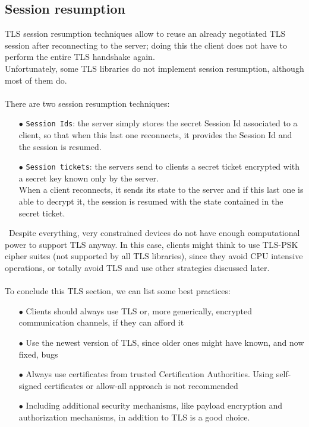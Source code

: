 \documentclass[12pt]{report}
\begin{document}
{{\subsection{Session resumption}
\bigskip
TLS session resumption techniques allow to reuse an already negotiated TLS session after reconnecting to the server; doing this the client does not have to perform the entire TLS handshake again.\\
Unfortunately, some TLS libraries do not implement session resumption, although most of them do.\\\\
There are two session resumption techniques:
\begin{itemize}
\setlength{\itemindent}{+4mm}
  \item[$\bullet$] \texttt{Session Ids}: the server simply stores the secret Session Id associated to a client, so that when this last one reconnects, it provides the Session Id and the session is resumed.
  \item[$\bullet$] \texttt{Session tickets}: the servers send to clients a secret ticket encrypted with a secret key known only by the server.\\
When a client reconnects, it sends its state to the server and if this last one is able to decrypt it, the session is resumed with the state contained in the secret ticket.
\end{itemize}\
Despite everything, very constrained devices do not have enough computational power to support TLS anyway. 
In this case, clients might think to use TLS-PSK cipher suites (not supported by all TLS libraries), since they avoid CPU intensive operations, or totally avoid TLS and use other strategies discussed later.\\\\

To conclude this TLS section, we can list some best practices:

\begin{itemize}
\setlength{\itemindent}{+4mm}
  \item[$\bullet$] Clients should always use TLS or, more generically, encrypted communication channels, if they can afford it
  \item[$\bullet$] Use the newest version of TLS, since older ones might have known, and now fixed, bugs~\cite{sslvulns}
  \item[$\bullet$] Always use certificates from trusted Certification Authorities. Using self-signed certificates or allow-all approach is not recommended
  \item[$\bullet$] Including additional security mechanisms, like payload encryption and authorization mechanisms, in addition to TLS is a good choice.


\end{itemize}}}
\end{document}
